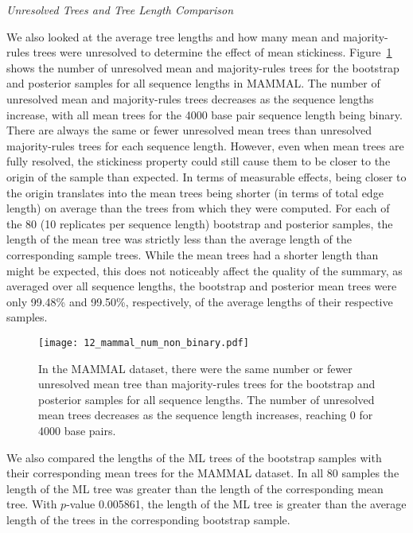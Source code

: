 \documentclass[12pt,letterpaper]{article}
\theoremstyle{plain}
\theoremstyle{definition}
\renewcommand{\subsection}[1]{%
\bigskip
\begin{center}
\begin{large}
\normalfont\itshape #1
\end{large}
\end{center}}
\begin{document}
\subsection{Unresolved Trees and Tree Length Comparison}
We also looked at the average tree lengths and how many mean and majority-rules trees were unresolved to determine the effect of mean stickiness.  Figure~\ref{f:unresolve} shows the number of unresolved mean and majority-rules trees for the bootstrap and posterior samples for all sequence lengths in MAMMAL.  The number of unresolved mean and majority-rules trees decreases as the sequence lengths increase, with all mean trees for the 4000 base pair sequence length being binary.  There are always the same or fewer unresolved mean trees than unresolved majority-rules trees for each sequence length.  However, even when mean trees are fully resolved, the stickiness property could still cause them to be closer to the origin of the sample than expected. In terms of measurable effects, being closer to the origin translates into the mean trees being shorter (in terms of total edge length) on average than the trees from which they were computed.  For each of the 80 (10 replicates per sequence length) bootstrap and posterior samples, the length of the mean tree was strictly less than the average length of the corresponding sample trees.
While the mean trees had a shorter length than might be expected, this does not noticeably affect the quality of the summary, as averaged over all sequence lengths, the bootstrap and posterior mean trees were only 99.48\% and 99.50\%, respectively, of the average lengths of their respective samples. 

\begin{figure}
\centering
\texttt{[image: 12\_mammal\_num\_non\_binary.pdf]}
\caption{In the MAMMAL dataset, there were the same number or fewer unresolved mean tree than majority-rules trees for the bootstrap and posterior samples for all sequence lengths.  The number of unresolved mean trees decreases as the sequence length increases, reaching 0 for 4000 base pairs.}
\centering
\label{f:unresolve}
\end{figure}

We also compared the lengths of the ML trees of the bootstrap samples with their corresponding mean trees for the MAMMAL dataset.  In all 80 samples the length of the ML tree was greater than the length of the corresponding mean tree.  With $p$-value 0.005861, the length of the ML tree is greater than the average length of the trees in the corresponding bootstrap sample.
\end{document}
